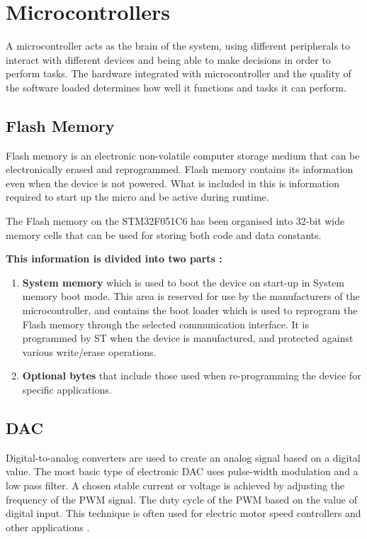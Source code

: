 \newpage
\section{Microcontrollers}
A microcontroller acts as the brain of the system, using different peripherals to interact with different devices and being able to make decisions in order to perform tasks. The hardware integrated with microcontroller and the quality of the software loaded determines how well it functions and tasks it can perform.

\subsection{Flash Memory}
Flash memory is an electronic non-volatile computer storage medium that can be electronically erased and reprogrammed. Flash memory contains its information even when the device is not powered. What is included in this is information required to start up the micro and be active during runtime.

The Flash memory on the STM32F051C6 has been organised into 32-bit wide memory cells that can be used for storing both code and data constants.

\textbf{This information is divided into two parts :}
\begin{enumerate}
\item{\textbf{System memory}}
which is used to boot the device on start-up in System memory boot mode. This area is reserved for use by the manufacturers of the microcontroller, and contains the boot loader which is used to reprogram the Flash memory through the selected communication interface. It is programmed by ST when the device is manufactured, and protected against various write/erase operations. 

\item{\textbf{Optional bytes}}
that include those used when re-programming the device for specific applications.
\end{enumerate}

\subsection{DAC}
Digital-to-analog converters are used to create an analog signal based on a digital value. The most basic type of electronic DAC uses pulse-width modulation and a low pass filter. A chosen stable current or voltage is achieved by adjusting the frequency of the PWM signal. The duty cycle of the PWM based on the value of digital input. This technique is often used for electric motor speed controllers and other applications \cite{DAC}.

